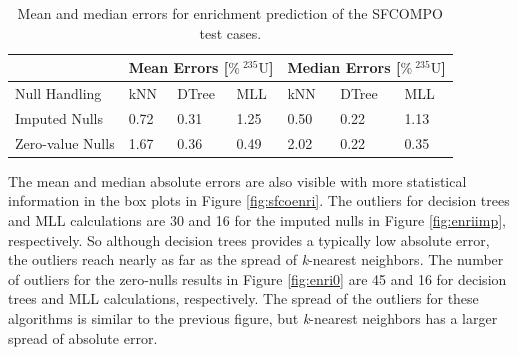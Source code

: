 \begin{table}[!htb]
  \centering
  \begin{tabular}{@{}m{1.5in}llllll@{}}
    \toprule
                     & \multicolumn{3}{m{2in}}{Mean Errors [$\%\:{}^{235}\text{U}$]} 
                     & \multicolumn{3}{l}{Median Errors [$\%\:{}^{235}\text{U}$]} 
                     \\ \toprule
    Null Handling    & kNN  & DTree & MLL  & kNN   & DTree & MLL    \\ \midrule
    Imputed Nulls    & 0.72 & 0.31  & 1.25 & 0.50  & 0.22  & 1.13   \\
    Zero-value Nulls & 1.67 & 0.36  & 0.49 & 2.02  & 0.22  & 0.35   \\ \bottomrule
  \end{tabular}
  \caption[Performance of enrichment regression of \acrshort{SFCOMPO} entries]
          {Mean and median errors for enrichment prediction of the \gls{SFCOMPO} 
           test cases.}
  \label{tbl:sfcoenri}
\end{table}

The mean and median absolute errors are also visible with more statistical
information in the box plots in Figure \ref{fig:sfcoenri}. The outliers for
decision trees and \gls{MLL} calculations are 30 and 16 for the imputed nulls
in Figure \ref{fig:enriimp}, respectively. So although decision trees provides
a typically low absolute error, the outliers reach nearly as far as the spread
of \textit{k}-nearest neighbors. The number of outliers for the zero-nulls
results in Figure \ref{fig:enri0} are 45 and 16 for decision trees and
\gls{MLL} calculations, respectively.  The spread of the outliers for these
algorithms is similar to the previous figure, but \textit{k}-nearest neighbors
has a larger spread of absolute error.

